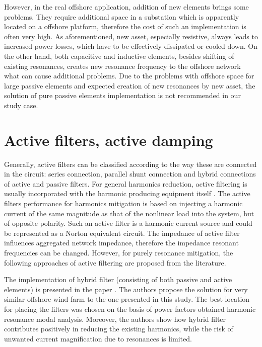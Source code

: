 \documentclass[a4paper,11pt,oneside]{report} %
\begin{document}
However, in the real offshore application, addition of new elements brings some problems. They require additional space in a substation which is apparently located on a offshore platform, therefore the cost of such an implementation is often very high. As aforementioned, new asset, especially resistive, always leads to increased power losses, which have to be effectively dissipated or cooled down. On the other hand, both capacitive and inductive elements, besides shifting of existing resonances, creates new resonance frequency to the offshore network what can cause additional problems. Due to the problems with offshore space for large passive elements and expected creation of new resonances by new asset, the solution of pure passive elements implementation is not recommended in our study case.

\section{Active filters, active damping}
Generally, active filters can be classified according to the way these are connected in the circuit: series connection, parallel shunt connection and hybrid connections of active and passive filters. For general harmonics reduction, active filtering is usually incorporated with the harmonic producing equipment itself \cite{das}. The active filters performance for harmonics mitigation is based on injecting a harmonic current of the same magnitude as that of the nonlinear load into the system, but of opposite polarity. Such an active filter is a harmonic current source and could be represented as a Norton equivalent circuit. The impedance of active filter influences aggregated network impedance, therefore the impedance resonant frequencies can be changed. However, for purely resonance mitigation, the following approaches of active filtering are proposed from the literature.

The implementation of hybrid filter (consisting of both passive and active elements) is presented in the paper \cite{hasan2014}. The authors propose the solution for very similar offshore wind farm to the one presented in this study. The best location for placing the filters was chosen on the basis of power factors obtained harmonic resonance modal analysis. Moreover, the authors show how hybrid filter contributes positively in reducing the existing harmonics, while the risk of unwanted current magnification due to resonances is limited.
\end{document}
